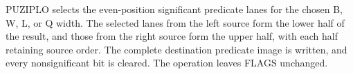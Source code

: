 PUZIPLO selects the even-position significant predicate lanes for the chosen B, W, L, or Q width.
The selected lanes from the left source form the lower half of the result, and those from the right source form the upper half, with each half retaining source order.
The complete destination predicate image is written, and every nonsignificant bit is cleared.
The operation leaves FLAGS unchanged.
